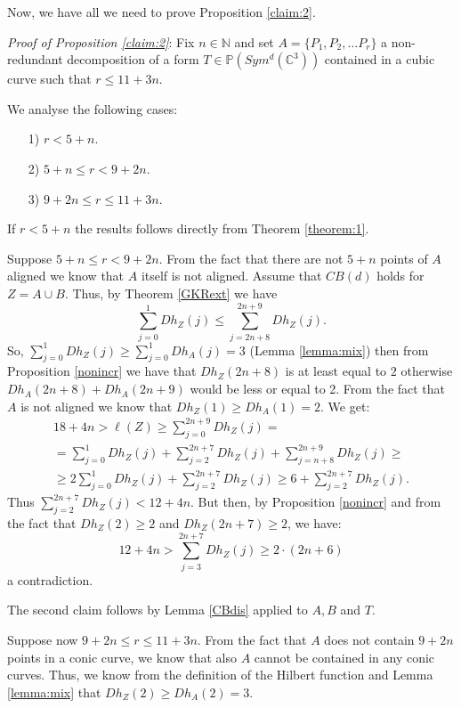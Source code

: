 \documentclass[a4paper,10pt,oneside]{article}
\theoremstyle{casep}
\newcommand{\C}{\mathbb{C}}
\newcommand{\Pj}{\mathbb{P}}
\newcommand{\N}{\mathbb{N}}
\theoremstyle{definition}
\begin{document}
Now, we have all we need to prove Proposition \ref{claim:2}.

\vspace{0.5 cm}

\emph{Proof of Proposition \ref{claim:2}}: Fix $ n \in \N $ and set $A= \{ P_1,P_2, \dots P_{r} \}$ a non-redundant decomposition of a form $ T \in \Pj(Sym^d(\C^3))$ contained in a cubic curve such that $ r\leq 11+3n $. 

We analyse the following cases:
\begin{itemize}
	\item[1)] $ r < 5+n $.
	\item[2)] $ 5+n \leq r < 9+2n $. 
	\item[3)] $ 9+2n \leq r \leq 11+3n $.
\end{itemize}
\vspace{5mm}
If $ r < 5+n $ the results follows directly from Theorem \ref{theorem:1}. 

\vspace{5mm}

Suppose $ 5+n \leq r < 9+2n $. From the fact that there are not $ 5+n $ points of $ A $ aligned we know that $ A $ itself is not aligned. Assume that $CB(d)$ holds for $Z=A\cup B$. Thus, by Theorem \ref{GKRext} we have
$$\sum_{j=0}^{1} Dh_Z(j) \leq \sum_{j=2n+8}^{2n+9}Dh_Z(j).$$ 
So, $\sum_{j=0}^{1}Dh_Z(j)\geq \sum_{j=0}^{1}Dh_A(j)=3$ (Lemma \ref{lemma:mix}) then from Proposition \ref{nonincr} we have that $Dh_Z(2n+8)$ 
is at least equal to $2$ otherwise $Dh_A(2n+8)+Dh_A(2n+9)$ would be less or equal to 2. 
From the fact that $A$ is not aligned we know that $Dh_Z(1) \geq Dh_A(1)=2$.
We get:
\begin{multline*} 18+4n > \ell(Z) \geq \sum_{j=0}^{2n+9}Dh_Z(j) = \\ = \sum_{j=0}^{1}Dh_Z(j)+\sum_{j=2}^{2n+7} Dh_Z(j)+\sum_{j=n+8}^{2n+9}Dh_Z(j) \geq
\\ \geq 2 \sum_{j=0}^{1}Dh_Z(j) + \sum_{j=2}^{2n+7} Dh_Z(j) \geq 6 + \sum_{j=2}^{2n+7} Dh_Z(j). \end{multline*}
Thus $\sum_{j=2}^{2n+7} Dh_Z(j) < 12+4n $. But then, by Proposition \ref{nonincr} and from the fact that $Dh_Z(2)\geq 2$ and $Dh_Z(2n+7)\geq 2$, we have:
$$12+4n > \sum_{j=3}^{2n+7}Dh_Z(j) \geq 2\cdot(2n+6)$$
a contradiction.

The second claim follows by Lemma \ref{CBdis} applied to $A,B$ and $T$.

\vspace{5mm}

Suppose now $ 9+2n \leq r \leq 11+3n $. From the fact that $ A $ does not contain $ 9+2n $ points in a conic curve, we know that also $ A $ cannot be contained in any conic curves. 
Thus, we know from the definition of the Hilbert function and Lemma \ref{lemma:mix} that $ Dh_Z(2) \geq Dh_A(2) = 3$. 
\end{document}
